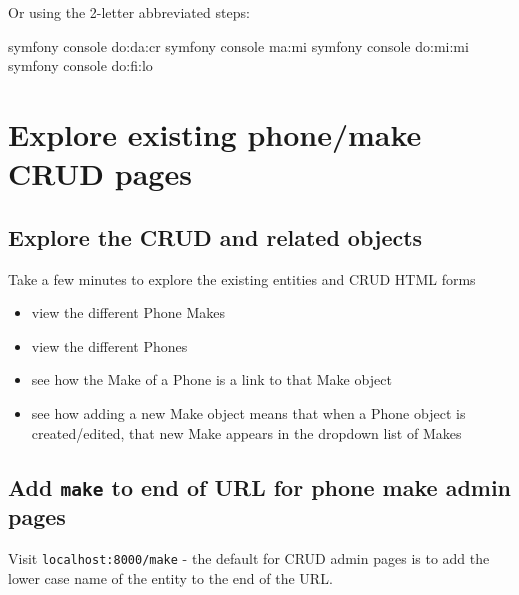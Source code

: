 \documentclass[a4paperpaper,openright]{book}
\newenvironment{Shaded}{}{}
\newcommand{\ExtensionTok}[1]{#1}
\newcommand{\NormalTok}[1]{#1}
\providecommand{\tightlist}{%
  \setlength{\itemsep}{0pt}\setlength{\parskip}{0pt}}
\begin{document}
Or using the 2-letter abbreviated steps:

\begin{Shaded}
\begin{Highlighting}[]
\ExtensionTok{symfony}\NormalTok{ console do:da:cr}
\ExtensionTok{symfony}\NormalTok{ console ma:mi}
\ExtensionTok{symfony}\NormalTok{ console do:mi:mi}
\ExtensionTok{symfony}\NormalTok{ console do:fi:lo}
\end{Highlighting}
\end{Shaded}

\hypertarget{explore-existing-phonemake-crud-pages}{%
\chapter{Explore existing phone/make CRUD
pages}\label{explore-existing-phonemake-crud-pages}}

\hypertarget{explore-the-crud-and-related-objects}{%
\section{Explore the CRUD and related
objects}\label{explore-the-crud-and-related-objects}}

Take a few minutes to explore the existing entities and CRUD HTML forms

\begin{itemize}
\tightlist
\item
  view the different Phone Makes
\item
  view the different Phones
\item
  see how the Make of a Phone is a link to that Make object
\item
  see how adding a new Make object means that when a Phone object is
  created/edited, that new Make appears in the dropdown list of Makes
\end{itemize}

\newpage

\hypertarget{add-make-to-end-of-url-for-phone-make-admin-pages}{%
\section{\texorpdfstring{Add \texttt{make} to end of URL for phone make
admin
pages}{Add make to end of URL for phone make admin pages}}\label{add-make-to-end-of-url-for-phone-make-admin-pages}}

Visit \texttt{localhost:8000/make} - the default for CRUD admin pages is
to add the lower case name of the entity to the end of the URL.
\end{document}
